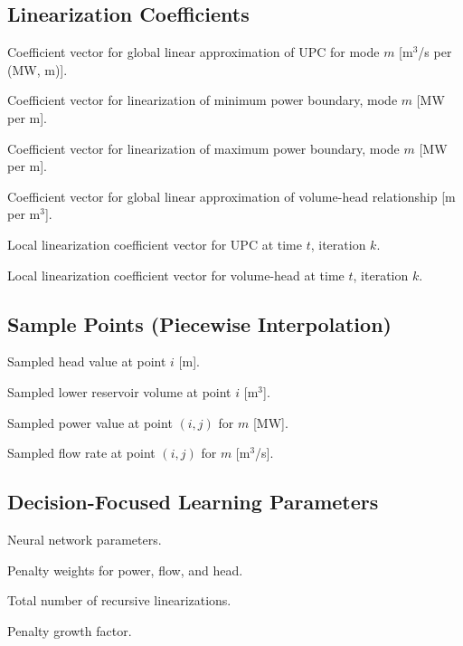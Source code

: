 \documentclass[journal]{IEEEtran}
\begin{document}
\subsection*{Linearization Coefficients}
\begin{IEEEdescription}
\item[$\boldsymbol{\alpha}_m$] Coefficient vector for global linear approximation of UPC for mode $m$ [m$^3$/s per (MW, m)].
\item[$\boldsymbol{\beta}_m^{\min}$] Coefficient vector for linearization of minimum power boundary, mode $m$ [MW per m].
\item[$\boldsymbol{\beta}_m^{\max}$] Coefficient vector for linearization of maximum power boundary, mode $m$ [MW per m].
\item[$\boldsymbol{\delta}$] Coefficient vector for global linear approximation of volume-head relationship [m per m$^3$].
\item[$\boldsymbol{\xi}_{q,t}^{(k)}$] Local linearization coefficient vector for UPC at time $t$, iteration $k$.
\item[$\boldsymbol{\xi}_{v,t}^{(k)}$] Local linearization coefficient vector for volume-head at time $t$, iteration $k$.
\end{IEEEdescription}

\subsection*{Sample Points (Piecewise Interpolation)}
\begin{IEEEdescription}
\item[$h_i^{\text{sample}}$] Sampled head value at point $i$ [m].
\item[$v_{\text{low},i}^{\text{sample}}$] Sampled lower reservoir volume at point $i$ [m$^3$].
\item[$p_{i,j}^{m,\text{sample}}$] Sampled power value at point $(i,j)$ for $m$ [MW].
\item[$q_{i,j}^{m,\text{sample}}$] Sampled flow rate at point $(i,j)$ for $m$ [m$^3$/s].
\end{IEEEdescription}

\subsection*{Decision-Focused Learning Parameters}
\begin{IEEEdescription}
\item[$\theta$] Neural network parameters.
\item[$\mathbf{w}_p, \mathbf{w}_q, \mathbf{w}_h$] Penalty weights for power, flow, and head.
\item[$K$] Total number of recursive linearizations.
\item[$\gamma > 1$] Penalty growth factor.
\end{IEEEdescription}
\end{document}
